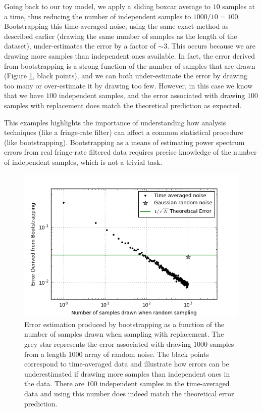 \documentclass[preprint2,numberedappendix,tighten,twocolappendix]{aastex6}  %
\begin{document}
Going back to our toy model, we apply a sliding boxcar average to $10$ samples at a time, thus reducing the number of independent samples to $1000/10 = 100$. Bootstrapping this time-averaged noise, using the same exact method as described earlier (drawing the same number of samples as the length of the dataset), under-estimates the error by a factor of $\sim3$. This occurs because we are drawing more samples than independent ones available. In fact, the error derived from bootstrapping is a strong function of the number of samples that are drawn (Figure \ref{fig:toy_error1}, black points), and we can both under-estimate the error by drawing too many or over-estimate it by drawing too few. However, in this case we know that we have $100$ independent samples, and the error associated with drawing $100$ samples with replacement does match the theoretical prediction as expected.

This examples highlights the importance of understanding how analysis techniques (like a fringe-rate filter) can affect a common statistical procedure (like bootstrapping). Bootstrapping as a means of estimating power spectrum errors from real fringe-rate filtered data requires precise knowledge of the number of independent samples, which is not a trivial task.

\begin{figure}
	\centering
	\includegraphics[trim={0.3cm 0.3cm 0.3cm 0.3cm},width=\columnwidth]{plots/toy_error1.png}
	\caption{Error estimation produced by bootstrapping as a function of the number of samples drawn when sampling with replacement. The grey star represents the error associated with drawing $1000$ samples from a length $1000$ array of random noise. The black points correspond to time-averaged data and illustrate how errors can be underestimated if drawing more samples than independent ones in the data. There are $100$ independent samples in the time-averaged data and using this number does indeed match the theoretical error prediction.}
	\label{fig:toy_error1}
\end{figure}
\end{document}
